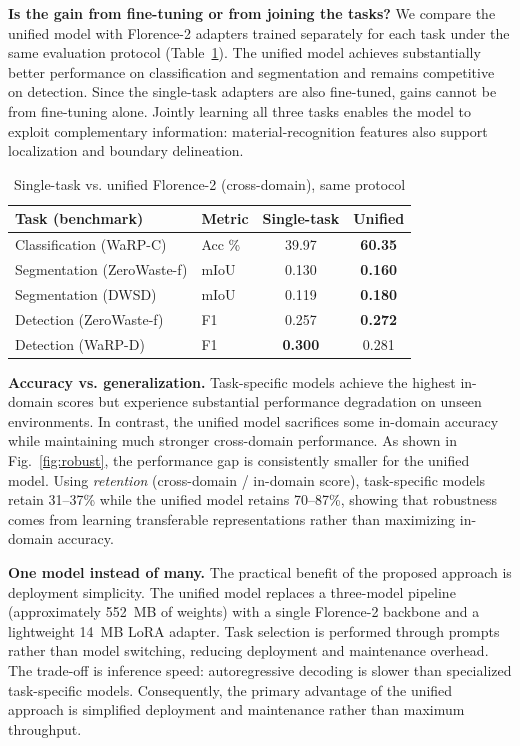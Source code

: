 \documentclass[conference]{IEEEtran}
\begin{document}
\textbf{Is the gain from fine-tuning or from joining the tasks?}
We compare the unified model with Florence-2 adapters trained separately for each
task under the same evaluation protocol (Table~\ref{tab:ablation}). The unified
model achieves substantially better performance on classification and segmentation
and remains competitive on detection. Since the single-task adapters are also fine-tuned, gains
cannot be from fine-tuning alone. Jointly learning all three tasks enables the
model to exploit complementary information: material-recognition features also
support localization and boundary delineation.
\vspace{-3mm}
\begin{table}[htbp]
\caption{Single-task vs. unified Florence-2 (cross-domain), same protocol}
\label{tab:ablation}
\begin{center}
\begin{tabular}{@{}llcc@{}}
\toprule
\textbf{Task (benchmark)} & \textbf{Metric} & \textbf{Single-task} & \textbf{Unified} \\
\midrule
Classification (WaRP-C) & Acc \% & 39.97 & \textbf{60.35} \\
Segmentation (ZeroWaste-f) & mIoU & 0.130 & \textbf{0.160} \\
Segmentation (DWSD) & mIoU & 0.119 & \textbf{0.180} \\
Detection (ZeroWaste-f) & F1 & 0.257 & \textbf{0.272} \\
Detection (WaRP-D) & F1 & \textbf{0.300} & 0.281 \\
\bottomrule
\end{tabular}
\end{center}
\end{table}

\textbf{Accuracy vs. generalization.}
Task-specific models achieve the highest in-domain scores but experience substantial
performance degradation on unseen environments. In contrast, the unified model
sacrifices some in-domain accuracy while maintaining much stronger cross-domain
performance. As shown in Fig.~\ref{fig:robust}, the performance gap is consistently smaller
for the unified model. Using \emph{retention} (cross-domain / in-domain score),
task-specific models retain 31--37\% while the unified model retains 70--87\%,
showing that robustness comes from learning transferable representations rather
than maximizing in-domain accuracy.

\textbf{One model instead of many.}
The practical benefit of the proposed approach is deployment simplicity. The unified
model replaces a three-model pipeline (approximately 552~MB of weights) with a single
Florence-2 backbone and a lightweight 14~MB LoRA adapter. Task selection is performed
through prompts rather than model switching, reducing deployment and maintenance
overhead. The trade-off is inference speed: autoregressive decoding is slower than
specialized task-specific models. Consequently, the primary advantage of the unified
approach is simplified deployment and maintenance rather than maximum throughput.
\end{document}
